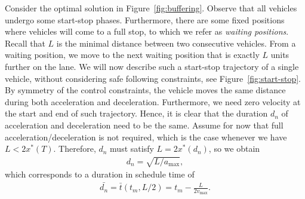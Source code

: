 \documentclass[a4paper]{article}
\theoremstyle{definition}
\theoremstyle{plain}
\begin{document}
Consider the optimal solution in Figure~\ref{fig:buffering}. Observe that all
vehicles undergo some start-stop phases. Furthermore, there are some fixed
positions where vehicles will come to a full stop, to which we refer as
\textit{waiting positions}. Recall that $L$ is the minimal distance between two
consecutive vehicles. From a waiting position, we move to the next waiting
position that is exactly $L$ units further on the lane.
%
We will now describe such a start-stop trajectory of a single vehicle, without
considering safe following constraints, see Figure~\ref{fig:start-stop}.
%
By symmetry of the control constraints, the vehicle moves the same distance
during both acceleration and deceleration. Furthermore, we need zero velocity at
the start and end of such trajectory. Hence, it is clear that the duration
$d_{n}$ of acceleration and deceleration need to be the same.
%
Assume for now that full acceleration/deceleration is not required, which is the
case whenever we have $L < 2 x^{*}(T)$. Therefore, $d_{n}$ must satisfy
$L = 2x^{*}(d_{n})$, so we obtain
\begin{align*}
d_{n} = \sqrt{L / a_{\max}} ,
\end{align*}
which corresponds to a duration in schedule time of
\begin{align*}
  \bar{d_{n}} = \bar{t}(t_{m}, L/2) = t_{m} - \frac{L}{2 v_{\max}} .
\end{align*}
\end{document}
